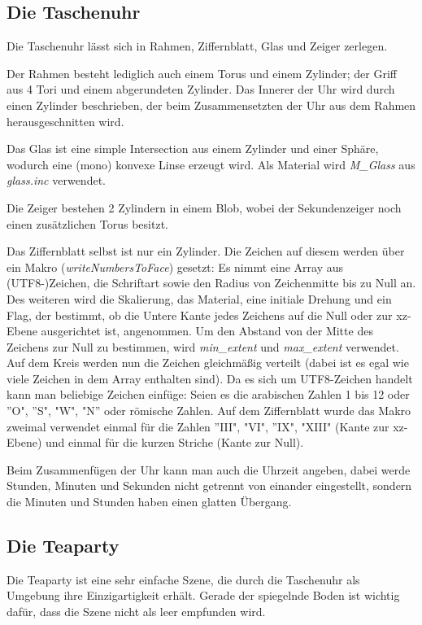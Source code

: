 \documentclass[twocolumn]{article}
\begin{document}
\subsection{Die Taschenuhr}
Die Taschenuhr lässt sich in Rahmen, Ziffernblatt, Glas und Zeiger zerlegen.

Der Rahmen besteht lediglich auch einem Torus und einem Zylinder; der Griff aus 4 Tori und einem abgerundeten Zylinder.
Das Innerer der Uhr wird durch einen Zylinder beschrieben, der beim Zusammensetzten der Uhr aus dem Rahmen herausgeschnitten wird.

Das Glas ist eine simple Intersection aus einem Zylinder und einer Sphäre, wodurch eine (mono) konvexe Linse erzeugt wird.
Als Material wird  \textit{M\_Glass} aus \textit{glass.inc} verwendet.

Die Zeiger bestehen 2 Zylindern in einem Blob, wobei der Sekundenzeiger noch einen zusätzlichen Torus besitzt.

Das Ziffernblatt selbst ist nur ein Zylinder. Die Zeichen auf diesem werden über ein Makro (\textit{writeNumbersToFace}) gesetzt:
Es nimmt eine Array aus (UTF8-)Zeichen, die Schriftart sowie den Radius von Zeichenmitte bis zu Null an. Des weiteren wird die Skalierung, das Material, eine initiale Drehung und ein Flag, der bestimmt, ob die Untere Kante jedes Zeichens auf die Null oder zur xz-Ebene ausgerichtet ist, angenommen. Um den Abstand von der Mitte des Zeichens zur Null zu bestimmen, wird \textit{min\_extent} und \textit{max\_extent} verwendet. Auf dem Kreis werden nun die Zeichen gleichmäßig verteilt (dabei ist es egal wie viele Zeichen in dem Array enthalten sind). Da es sich um UTF8-Zeichen handelt kann man beliebige Zeichen einfüge: Seien es die arabischen Zahlen 1 bis 12 oder  ''O", ''S", "W", "N'' oder römische Zahlen.
Auf dem Ziffernblatt wurde das Makro zweimal verwendet einmal für die Zahlen ''III", "VI", ''IX", "XIII" (Kante zur xz-Ebene) und einmal für die kurzen Striche (Kante zur Null).

Beim Zusammenfügen der Uhr kann man auch die Uhrzeit angeben, dabei werde Stunden, Minuten und Sekunden nicht getrennt von einander eingestellt, sondern die Minuten und Stunden haben einen glatten Übergang.

\subsection{Die Teaparty}
Die Teaparty ist eine sehr einfache Szene, die durch die Taschenuhr als Umgebung ihre Einzigartigkeit erhält.
Gerade der spiegelnde Boden ist wichtig dafür, dass die Szene nicht als leer empfunden wird.
\end{document}

